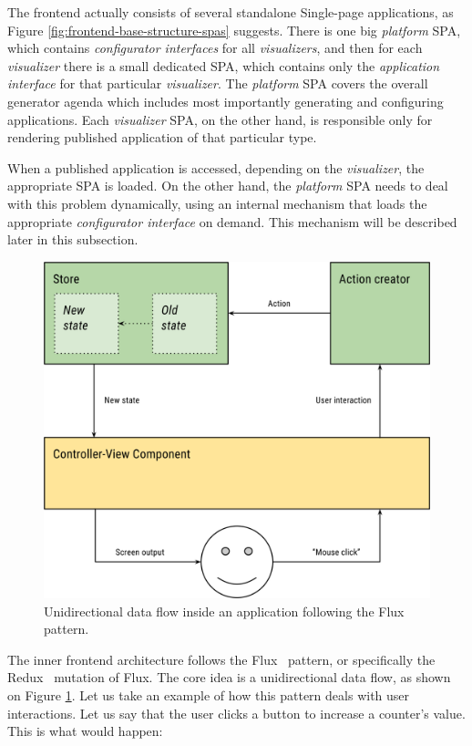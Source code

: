 The frontend actually consists of several standalone Single-page applications, as Figure \ref{fig:frontend-base-structure-spas} suggests. There is one big \emph{platform} SPA, which contains \emph{configurator interfaces} for all \emph{visualizers}, and then for each \emph{visualizer} there is a small dedicated SPA, which contains only the \emph{application interface} for that particular \emph{visualizer}. The \emph{platform} SPA covers the overall generator agenda which includes most importantly generating and configuring applications. Each \emph{visualizer} SPA, on the other hand, is responsible only for rendering published application of that particular type. 

When a published application is accessed, depending on the \emph{visualizer}, the appropriate SPA is loaded. On the other hand, the \emph{platform} SPA needs to deal with this problem dynamically, using an internal mechanism that loads the appropriate \emph{configurator interface} on demand. This mechanism will be described later in this subsection.
\begin{figure}
	\centering
	\includegraphics[width=120mm]{img/04_frontend_flux_redux.png}
	\caption{Unidirectional data flow inside an application following the Flux~\cite{flux} pattern.} 
	\label{fig:frontend-flux-redux}
\end{figure}

The inner frontend architecture follows the Flux~\cite{flux} pattern, or specifically the Redux~\cite{redux} mutation of Flux. The core idea is a unidirectional data flow, as shown on Figure \ref{fig:frontend-flux-redux}. Let us take an example of how this pattern deals with user interactions. Let us say that the user clicks a button to increase a counter's value. This is what would happen:

